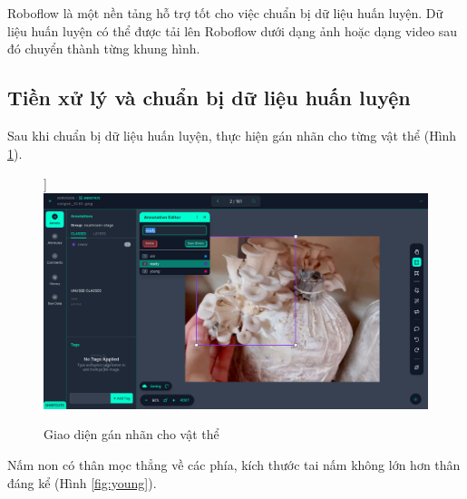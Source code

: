 Roboflow là một nền tảng hỗ trợ tốt cho việc chuẩn bị dữ liệu huấn luyện. Dữ liệu huấn luyện có thể được tải lên Roboflow dưới dạng ảnh hoặc dạng video sau đó chuyển thành từng khung hình.


\subsection{Tiền xử lý và chuẩn bị dữ liệu huấn luyện}

Sau khi chuẩn bị dữ liệu huấn luyện, thực hiện gán nhãn cho từng vật thể (Hình \ref{fig:labeling-interface}).

\begin{figure}[H]]
    \centering
    \includegraphics[width=0.85\linewidth]{images/image-labeling.png}
    \caption{Giao diện gán nhãn cho vật thể}
    \label{fig:labeling-interface}
\end{figure}

Nấm non có thân mọc thẳng về các phía, kích thước tai nấm không lớn hơn thân đáng kể (Hình \ref{fig:young}).

